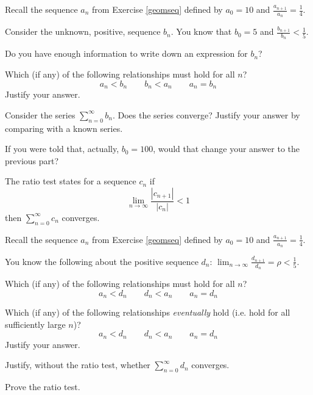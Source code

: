 \documentclass{workbook}
\begin{document}
\begin{slide}
	\question
	Recall the sequence $a_n$ from Exercise \ref{geomseq} defined by
	$a_0=10$ and
	$\displaystyle
		\frac{a_{n+1}}{a_n}= \frac{1}{4}
	$.

	Consider the unknown, positive, sequence $b_n$. You know that $b_0=5$ and
	$\displaystyle \frac{b_{n+1}}{b_n} < \frac{1}{5}$.

	\begin{parts}
		\item Do you have enough information to write down an expression for $b_n$?

		\item Which (if any) of the following relationships must hold for all $n$?
		\[
			a_n < b_n \qquad b_n < a_n \qquad a_n = b_n
		\]
		Justify your answer.

		\item Consider the series $\displaystyle \sum_{n=0}^\infty
			b_n$. Does the series converge? Justify your answer by comparing with
		a known series.

		\item If you were told that, actually, $b_0=100$, would that
		change your answer to the previous part?
	\end{parts}

\end{slide}
\begin{slide}
	\question
	The ratio test states for a sequence $c_n$ if
	\[
		\lim_{n\to\infty} \frac{|c_{n+1}|}{|c_n|} < 1
	\]
	then $\displaystyle \sum_{n=0}^\infty c_n$ converges.

	Recall the sequence $a_n$ from Exercise \ref{geomseq} defined by
	$a_0=10$ and
	$\displaystyle
		\frac{a_{n+1}}{a_n}= \frac{1}{4}
	$.

	You know the following about the positive sequence $d_n$:
	$\displaystyle \lim_{n\to\infty} \frac{d_{n+1}}{d_n} =\rho < \frac{1}{5}$.

	\begin{parts}
		\item Which (if any) of the following relationships must hold for all $n$?
		\[
			a_n < d_n \qquad d_n < a_n \qquad a_n = d_n
		\]
		\item Which (if any) of the following relationships \emph{eventually} hold (i.e. hold for all sufficiently large $n$)?
		\[
			a_n < d_n \qquad d_n < a_n \qquad a_n = d_n
		\]
		Justify your answer.

		\item Justify, without the ratio test, whether $\displaystyle
			\sum_{n=0}^\infty d_n$ converges.

		\item Prove the ratio test.
	\end{parts}
\end{slide}
\end{document}
